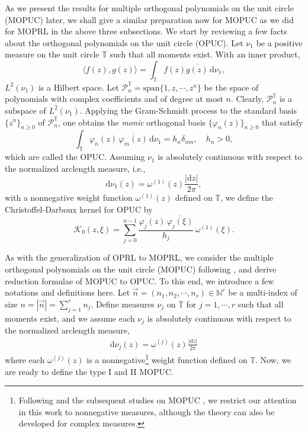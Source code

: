 \documentclass[a4paper,10pt,leqno]{amsart}
\numberwithin{equation}{section}
\theoremstyle{remark}
\newcommand{\dd}{\mathrm{d}}
\newcommand{\N}{\mathbb{N}}
\newcommand{\TT}{\mathbb{T}}
\newcommand{\ip}[2]{\langle #1, #2 \rangle}
\begin{document}
As we present the results for multiple orthogonal polynomials on the unit circle (MOPUC) later, we shall give a similar preparation now for MOPUC as we did for MOPRL in the above three subsections. 
We start by reviewing a few facts about the orthogonal polynomials on the unit circle (OPUC).
Let $\nu_1$ be a positive measure on the unit circle $\TT$ such that all moments exist. With an inner product,
\begin{equation}
\ip{f(z)}{g(z)} = \int_{\TT} f(z) \overline{g(z)} \, \dd \nu_1,
\end{equation}
$L^2(\nu_1)$ is a Hilbert space.
Let $\mathcal{P}^{\TT}_n = \mathrm{span} \{1, z, \cdots, z^n\}$ be the space of polynomials with complex coefficients and of degree at most $n$. Clearly, $\mathcal{P}^{\TT}_n$ is a subspace of $L^2(\nu_1)$. 
Applying the Gram-Schmidt process to the standard basis $\{z^n\}_{n \geq 0}$ of $\mathcal{P}^{\TT}_n$, one obtains the \textit{monic} orthogonal basis $\{ \varphi_n(z) \}_{n \geq 0}$ that satisfy
\begin{equation} \label{opuc orthogonality}
\int_{\TT} \varphi_n(z) \, \overline{\varphi_m(z)} \, \dd \nu_1 = h_n \delta_{nm}, \quad h_n > 0,
\end{equation}
which are called the OPUC.
Assuming $\nu_1$ is absolutely continuous with respect to the normalized arclength measure, i.e.,
\[
\dd \nu_1 (z) = \omega^{(1)}(z) \frac{|\dd z|}{2\pi},
\]
with a nonnegative weight function $\omega^{(1)}(z)$ defined on $\TT$, we define the Christoffel-Darboux kernel for OPUC by
\begin{equation}\label{eq:Szego-kernel}
\mathcal K_0(z,\xi) = \sum_{j=0}^{n-1} \frac{\varphi_j(z) \, \overline{\varphi_j(\xi)}}{h_j} \, \omega^{(1)}(\xi).
\end{equation}

As with the generalization of OPRL to MOPRL, we consider the multiple orthogonal polynomials on the unit circle (MOPUC) following \cite{MCVA08, CBDMO15, KV24a}, and derive reduction formulae of MOPUC to OPUC.
To this end, we introduce a few notations and definitions here.
Let $\vec{n} = (n_1, n_2, \cdots, n_r) \in \N^r$ be a multi-index of size $n=|\vec{n}|=\sum_{j=1}^r n_j$.
Define measures $\nu_j$ on $\TT$ for $j = 1, \cdots, r$ such that all moments exist, and we assume each $\nu_j$ is absolutely continuous with respect to the normalized arclength measure,
\begin{align} \label{nuj and wj}
\dd \nu_j(z) = \omega^{(j)}(z) \frac{|\dd z|}{2\pi}
\end{align}
where each $\omega^{(j)}(z)$ is a nonnegative\footnote{Following \cite{MCVA08} and the subsequent studies on MOPUC \cite{CBDMO15, KV24a, MOPUC4, MOPUC5, MCVA08}, we restrict our attention in this work to nonnegative measures, although the theory can also be developed for complex measures.} weight function defined on $\TT$.
Now, we are ready to define the type I and II MOPUC. 
\end{document}
